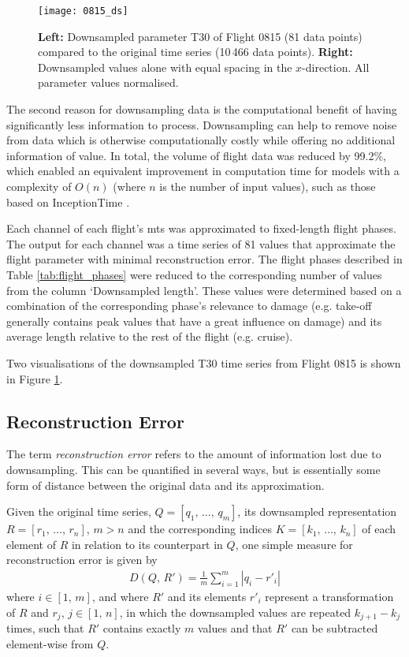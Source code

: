\begin{figure}
    \centering
    \texttt{[image: 0815\_ds]}
    \caption{\label{fig:0815_ds} \textbf{Left:} Downsampled parameter T30 of Flight 0815 (81 data points) compared to the original time series (10\,466 data points). \textbf{Right:} Downsampled values alone with equal spacing in the \(x\)-direction. All parameter values normalised.}
\end{figure}

The second reason for downsampling data is the computational benefit of having significantly less information to process. Downsampling can help to remove noise from data which is otherwise computationally costly while offering no additional information of value. In total, the volume of flight data was reduced by 99.2\%, which enabled an equivalent improvement in computation time for models with a complexity of \(O(n)\) (where \(n\) is the number of input values), such as those based on InceptionTime \cite[]{fawaz_inceptiontime_2019}.

Each channel of each flight's \ac{mts} was approximated to fixed-length flight phases. The output for each channel was a time series of 81 values that approximate the flight parameter with minimal reconstruction error. The flight phases described in Table \ref{tab:flight_phases} were reduced to the corresponding number of values from the column `Downsampled length'. These values were determined based on a combination of the corresponding phase's relevance to damage (e.g. take-off generally contains peak values that have a great influence on damage) and its average length relative to the rest of the flight (e.g. cruise).

Two visualisations of the downsampled T30 time series from Flight 0815 is shown in Figure \ref{fig:0815_ds}.

\subsection{Reconstruction Error} \label{sec:recon_err}
The term \textit{reconstruction error} refers to the amount of information lost due to downsampling. This can be quantified in several ways, but is essentially some form of distance between the original data and its approximation.

Given the original time series, \(Q = \left[q_1,\,\ldots,\,q_m\right]\), its downsampled representation \(R = \left[r_1,\,\ldots,\,r_n\right]\), \(m > n\) and the corresponding indices \(K = \left[k_1,\,\ldots,\,k_n\right]\) of each element of \(R\) in relation to its counterpart in \(Q\), one simple measure for reconstruction error is given by
\begin{align} \label{eq:recon_err}
    D(Q,\,R') = \frac{1}{m}\sum_{i=1}^{m}{\left|q_i - r'_i\right|}
\end{align}
where \(i \in \left[1,\,m\right]\), and where \(R'\) and its elements \(r'_i\) represent a transformation of \(R\) and \(r_j\), \(j \in \left[1,\,n\right]\), in which the downsampled values are repeated \(k_{j + 1} - k_j\) times, such that \(R'\) contains exactly \(m\) values and that \(R'\) can be subtracted element-wise from \(Q\).

